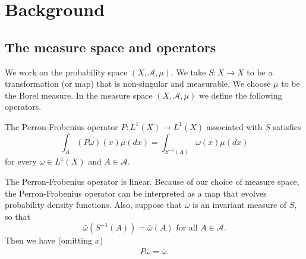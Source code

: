 %
%

\section{Background}
\label{sec:numcutoffbackground}

\subsection{The measure space and operators}

We work on the probability space $(X,\mathcal{A},\mu)$. We take $S: X
\to X$ to be a transformation (or map) that is non-singular and
measurable. We choose $\mu$ to be the Borel measure. In the measure
space $(X,\mathcal{A},\mu)$ we define the following operators.

\begin{definition}
The Perron-Frobenius operator $P:L^1(X) \to L^1(X)$ associated with
$S$ satisfies
\begin{equation}
  \int_A (P \omega)(x)\mu(dx) = \int_{S^{-1}(A)} \omega(x)\mu(dx)
\end{equation}
for every $\omega \in L^1(X)$ and $A \in \mathcal{A}$.
\end{definition}
The Perron-Frobenius operator is linear. Because of our choice of
measure space, the Perron-Frobenius operator can be interpreted as a
map that evolves probability density functions. Also, suppose that
$\bar{\omega}$ is an invariant measure of $S$, so that
\begin{equation}
   \bar{\omega}(S^{-1}(A)) = \bar{\omega}(A)  \text{ for all } A \in \mathcal{A}.
\end{equation}
Then we have (omitting $x$)
\begin{eqnarray}
  P \bar{\omega} = \bar{\omega}.
\end{eqnarray}

